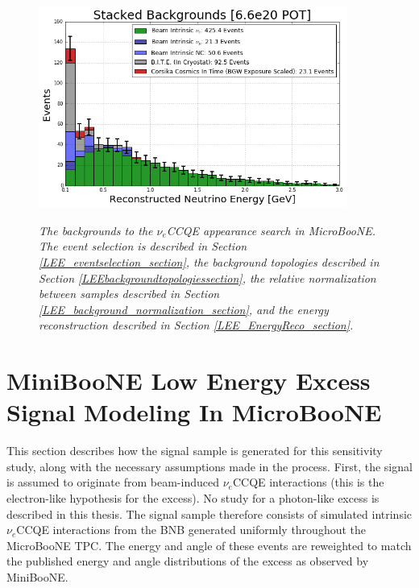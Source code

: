 \begin{figure}[ht!]
\centering
\includegraphics[width=0.9\textwidth]{Figures/LEE_stackedbackgrounds_nosignal_withAnalysisCuts.png}\\
\caption{\textit{The backgrounds to the $\nu_e$CCQE appearance search in MicroBooNE. The event selection is described in Section \ref{LEE_eventselection_section}, the background topologies described in Section \ref{LEEbackgroundtopologiessection}, the relative normalization between samples described in Section \ref{LEE_background_normalization_section}, and the energy reconstruction described in Section \ref{LEE_EnergyReco_section}.}}
\label{LEE_stackedbackgrounds_nosignal_withanalysiscuts_fig}
\end{figure}





\section{MiniBooNE Low Energy Excess Signal Modeling In MicroBooNE}\label{MBLEESignalModeling_section}
This section describes how the signal sample is generated for this sensitivity study, along with the necessary assumptions made in the process. First, the signal is assumed to originate from beam-induced $\nu_e$CCQE interactions (this is the electron-like hypothesis for the excess). No study for a photon-like excess is described in this thesis. The signal sample therefore consists of simulated intrinsic $\nu_e$CCQE interactions from the BNB generated uniformly throughout the MicroBooNE TPC. The energy and angle of these events are reweighted to match the published energy and angle distributions of the excess as observed by MiniBooNE. \\


